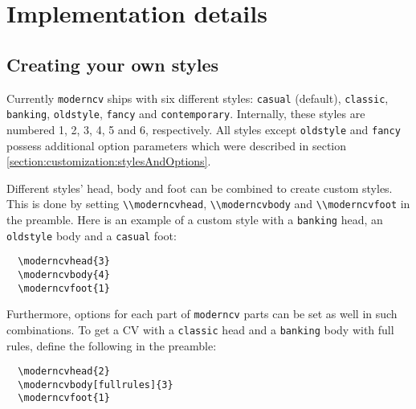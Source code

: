 \documentclass[a4paper, 11pt]{article}
\newcommand{\code}[1]{\lstinline!#1!}
\newcommand{\moderncv}{\code{moderncv}}
\begin{document}
\section{Implementation details}
\label{section:implementationDetails}

\subsection{Creating your own styles}
Currently {\moderncv} ships with six different styles: \texttt{casual} (default), \texttt{classic}, \texttt{banking}, \texttt{oldstyle}, \texttt{fancy} and \texttt{contemporary}. Internally, these styles are numbered 1, 2, 3, 4, 5 and 6, respectively. All styles except \texttt{oldstyle} and \texttt{fancy} possess additional option parameters which were described in section \ref{section:customization:stylesAndOptions}.

Different styles' head, body and foot can be combined to create custom styles. This is done by setting \code{\\moderncvhead}, \code{\\moderncvbody} and \code{\\moderncvfoot} in the preamble. Here is an example of a custom style with a \texttt{banking} head, an \texttt{oldstyle} body and a \texttt{casual} foot:
\begin{lstlisting}
  \moderncvhead{3}
  \moderncvbody{4}
  \moderncvfoot{1}
\end{lstlisting}
Furthermore, options for each part of {\moderncv} parts can be set as well in such combinations. To get a CV with a \texttt{classic} head and a \texttt{banking} body with full rules, define the following in the preamble:
\begin{lstlisting}
  \moderncvhead{2}
  \moderncvbody[fullrules]{3}
  \moderncvfoot{1}
\end{lstlisting}
\end{document}
